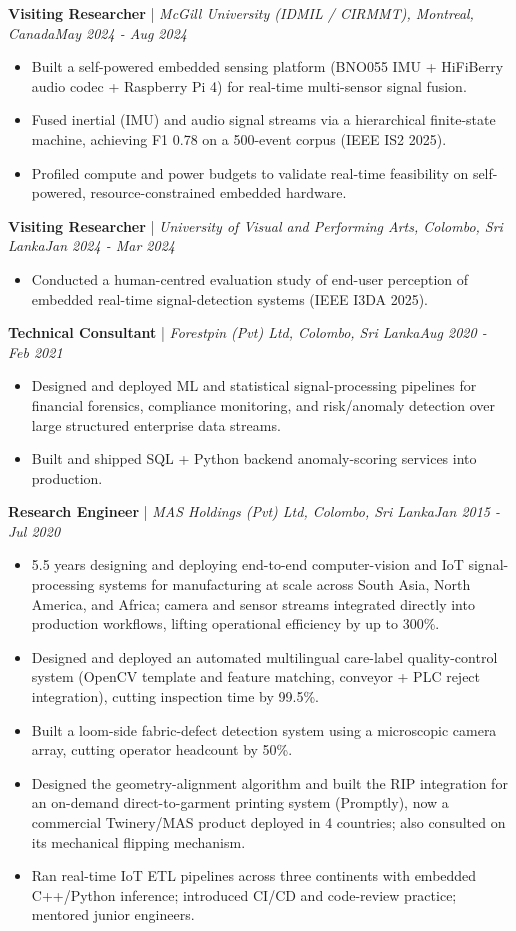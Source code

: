 \documentclass[11pt]{article}
\newenvironment{cvrole}[5]{%
  \par\noindent\textbf{\large #1} | \textit{\small #2, #3}\hfill \textit{\small #4 - #5}\par
  \begin{itemize}[leftmargin=2em, itemsep=-0.3em, topsep=-0.5em]%
}{%
  \end{itemize}\par\noindent\mbox{}\par\vspace{0.1em}%
}
\begin{document}
\begin{cvrole}{Visiting Researcher}{McGill University (IDMIL / CIRMMT)}{Montreal, Canada}{May 2024}{Aug 2024}
    \item Built a self-powered embedded sensing platform (BNO055 IMU + HiFiBerry audio codec + Raspberry Pi 4) for real-time multi-sensor signal fusion.
    \item Fused inertial (IMU) and audio signal streams via a hierarchical finite-state machine, achieving F1 0.78 on a 500-event corpus (IEEE IS2 2025).
    \item Profiled compute and power budgets to validate real-time feasibility on self-powered, resource-constrained embedded hardware.
\end{cvrole}

\begin{cvrole}{Visiting Researcher}{University of Visual and Performing Arts}{Colombo, Sri Lanka}{Jan 2024}{Mar 2024}
    \item Conducted a human-centred evaluation study of end-user perception of embedded real-time signal-detection systems (IEEE I3DA 2025).
\end{cvrole}

\begin{cvrole}{Technical Consultant}{Forestpin (Pvt) Ltd}{Colombo, Sri Lanka}{Aug 2020}{Feb 2021}
    \item Designed and deployed ML and statistical signal-processing pipelines for financial forensics, compliance monitoring, and risk/anomaly detection over large structured enterprise data streams.
    \item Built and shipped SQL + Python backend anomaly-scoring services into production.
\end{cvrole}

\begin{cvrole}{Research Engineer}{MAS Holdings (Pvt) Ltd}{Colombo, Sri Lanka}{Jan 2015}{Jul 2020}
    \item 5.5 years designing and deploying end-to-end computer-vision and IoT signal-processing systems for manufacturing at scale across South Asia, North America, and Africa; camera and sensor streams integrated directly into production workflows, lifting operational efficiency by up to 300\%.
    \item Designed and deployed an automated multilingual care-label quality-control system (OpenCV template and feature matching, conveyor + PLC reject integration), cutting inspection time by 99.5\%.
    \item Built a loom-side fabric-defect detection system using a microscopic camera array, cutting operator headcount by 50\%.
    \item Designed the geometry-alignment algorithm and built the RIP integration for an on-demand direct-to-garment printing system (Promptly), now a commercial Twinery/MAS product deployed in 4 countries; also consulted on its mechanical flipping mechanism.
    \item Ran real-time IoT ETL pipelines across three continents with embedded C++/Python inference; introduced CI/CD and code-review practice; mentored junior engineers.
\end{cvrole}
\end{document}
